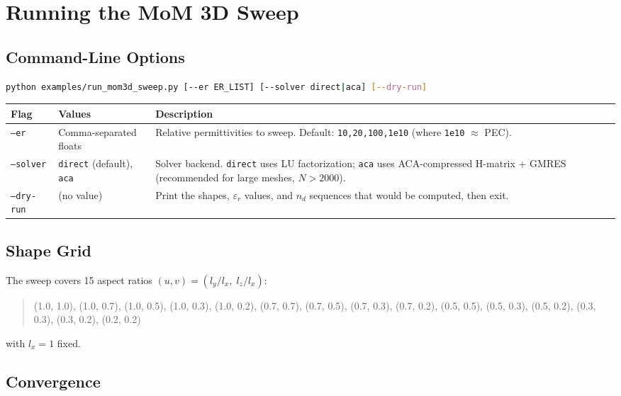 \documentclass[a4paper,11pt]{article}
\begin{document}
\section{Running the MoM 3D Sweep}

\subsection{Command-Line Options}

\begin{lstlisting}[language=bash]
python examples/run_mom3d_sweep.py [--er ER_LIST] [--solver direct|aca] [--dry-run]
\end{lstlisting}

\begin{center}
\begin{tabular}{@{}llp{6cm}@{}}
\toprule
Flag & Values & Description \\
\midrule
\texttt{--er} & Comma-separated floats
    & Relative permittivities to sweep.
      Default: \texttt{10,20,100,1e10} (where \texttt{1e10} $\approx$ PEC). \\
\texttt{--solver} & \texttt{direct} (default), \texttt{aca}
    & Solver backend.  \texttt{direct} uses LU factorization;
      \texttt{aca} uses ACA-compressed H-matrix + GMRES (recommended for
      large meshes, $N > 2000$). \\
\texttt{--dry-run} & (no value)
    & Print the shapes, $\varepsilon_r$ values, and $n_d$ sequences
      that would be computed, then exit. \\
\bottomrule
\end{tabular}
\end{center}

\subsection{Shape Grid}
\label{sec:mom3d_shapegrid}

The sweep covers 15 aspect ratios $(u,v) = (l_y/l_x,\; l_z/l_x)$:
%
\begin{quote}
\ttfamily
(1.0, 1.0), (1.0, 0.7), (1.0, 0.5), (1.0, 0.3), (1.0, 0.2),
(0.7, 0.7), (0.7, 0.5), (0.7, 0.3), (0.7, 0.2),
(0.5, 0.5), (0.5, 0.3), (0.5, 0.2),
(0.3, 0.3), (0.3, 0.2), (0.2, 0.2)
\end{quote}
%
with $l_x = 1$ fixed.

\subsection{Convergence}
\end{document}
